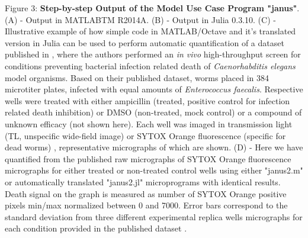Figure 3: \textbf{Step-by-step Output of the Model Use Case Program "janus"}. (A) - Output in MATLABTM R2014A. (B) - Output in Julia 0.3.10. (C) - Illustrative example of how simple code in MATLAB/Octave and it's translated version in Julia can be used to perform automatic quantification of a dataset published in \cite{Moy_2009}, where the authors performed an \textit{in vivo} high-throughput screen for conditions preventing bacterial infection related death of \textit{Caenorhabditis elegans} model organisms. Based on their published dataset, worms placed in 384 microtiter plates, infected with equal amounts of \textit{Enterococcus faecalis}. Respective wells were treated with either ampicillin (treated, positive control for infection related death inhibition) or DMSO (non-treated, mock control) or a compound of unknown efficacy (not shown here). Each well was imaged in transmission light (TL, unspecific wide-field image) or SYTOX Orange fluorescence (specific for dead worms) \cite{Moy_2009}, representative micrographs of which are shown. (D) - Here we have quantified from the published raw micrographs of SYTOX Orange fluorescence micrographs for either treated or non-treated control wells using either "janus2.m" or automatically translated "janus2.jl" microprograms with identical results. Death signal on the graph is measured as number of SYTOX Orange positive pixels min/max normalized between 0 and 7000. Error bars correspond to the standard deviation from three different experimental replica wells micrographs for each condition provided in the published dataset \cite{Moy_2009}.
